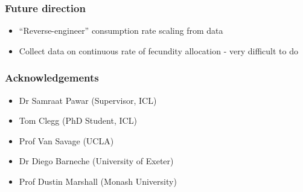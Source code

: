 \documentclass[handout]{beamer}
\begin{document}
\begin{frame}
	\frametitle{Future direction}
	\begin{itemize}
		\item ``Reverse-engineer'' consumption rate scaling from \textcite{Barneche2018-reproductive_output} data 
		\item Collect data on continuous rate of fecundity allocation - very difficult to do
	\end{itemize}
\end{frame}
\begin{frame}
	\frametitle{Acknowledgements}
	\begin{itemize}
		\item Dr Samraat Pawar (Supervisor, ICL) 
		\item Tom Clegg (PhD Student, ICL)
		\item Prof Van Savage (UCLA)
		\item Dr Diego Barneche (University of Exeter)
		\item Prof Dustin Marshall (Monash University)
	\end{itemize}
\end{frame}
\end{document}
